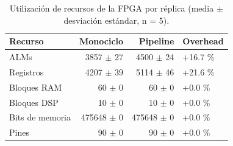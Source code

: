 \begin{table}[htbp]
\centering
\caption{Utilización de recursos de la FPGA por réplica (media $\pm$ desviación estándar, n = 5).}
\label{tab:resources}
\begin{tabular}{lrrl}
\toprule
Recurso & Monociclo & Pipeline & Overhead \\
\midrule
ALMs & 3857 $\pm$ 27 & 4500 $\pm$ 24 & +16.7 \% \\
Registros & 4207 $\pm$ 39 & 5114 $\pm$ 46 & +21.6 \% \\
Bloques RAM & 60 $\pm$ 0 & 60 $\pm$ 0 & +0.0 \% \\
Bloques DSP & 10 $\pm$ 0 & 10 $\pm$ 0 & +0.0 \% \\
Bits de memoria & 475648 $\pm$ 0 & 475648 $\pm$ 0 & +0.0 \% \\
Pines & 90 $\pm$ 0 & 90 $\pm$ 0 & +0.0 \% \\
\bottomrule
\end{tabular}
\end{table}
